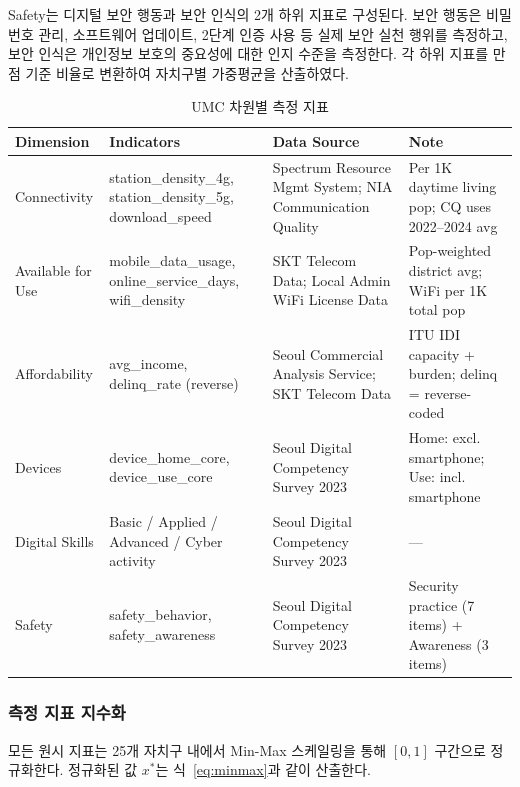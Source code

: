 Safety는 디지털 보안 행동과 보안 인식의 2개 하위 지표로 구성된다. 보안 행동은 비밀번호 관리, 소프트웨어 업데이트, 2단계 인증 사용 등 실제 보안 실천 행위를 측정하고, 보안 인식은 개인정보 보호의 중요성에 대한 인지 수준을 측정한다. 각 하위 지표를 만점 기준 비율로 변환하여 자치구별 가중평균을 산출하였다.

\begin{table}[htbp]
  \centering\small
  \caption{UMC 차원별 측정 지표}
  \label{tab:1-umc-dims}
  \begin{tabularx}{\textwidth}{l Y Y Y}
    \toprule
    \textbf{Dimension} & \textbf{Indicators} & \textbf{Data Source} & \textbf{Note} \\
    \midrule
    Connectivity & station\_density\_4g, station\_density\_5g, download\_speed & Spectrum Resource Mgmt System; NIA Communication Quality & Per 1K daytime living pop; CQ uses 2022--2024 avg \\
    \addlinespace[2pt]
    Available for Use & mobile\_data\_usage, online\_service\_days, wifi\_density & SKT Telecom Data; Local Admin WiFi License Data & Pop-weighted district avg; WiFi per 1K total pop \\
    \addlinespace[2pt]
    Affordability & avg\_income, delinq\_rate (reverse) & Seoul Commercial Analysis Service; SKT Telecom Data & ITU IDI capacity + burden; delinq = reverse-coded \\
    \addlinespace[2pt]
    Devices & device\_home\_core, device\_use\_core & Seoul Digital Competency Survey 2023 & Home: excl. smartphone; Use: incl. smartphone \\
    \addlinespace[2pt]
    Digital Skills & Basic / Applied / Advanced / Cyber activity & Seoul Digital Competency Survey 2023 & --- \\
    \addlinespace[2pt]
    Safety & safety\_behavior, safety\_awareness & Seoul Digital Competency Survey 2023 & Security practice (7 items) + Awareness (3 items) \\
    \bottomrule
  \end{tabularx}
\end{table}

\subsubsection{측정 지표 지수화}
\label{subsubsec:3-1-2}

모든 원시 지표는 25개 자치구 내에서 Min-Max 스케일링을 통해 $[0,1]$ 구간으로 정규화한다. 정규화된 값 $x^{*}$는 식~\eqref{eq:minmax}과 같이 산출한다.

